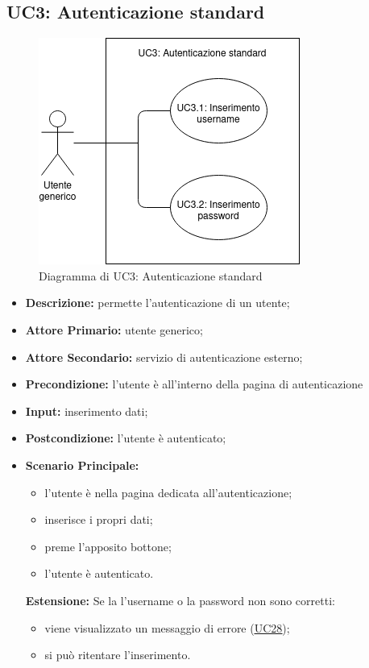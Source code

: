 \subsection{UC3: Autenticazione standard}
\begin{figure}[!ht]
    \caption{Diagramma di UC3: Autenticazione standard}
    \vspace{10px}
    \includegraphics[scale=0.5]{../../../Images/AnalisiRequisiti/UC03}
    \centering
\end{figure}
\label{sec:UC3}
\begin{itemize}
    \item \textbf{Descrizione:} permette l'autenticazione di un utente;
    \item \textbf{Attore Primario:} utente generico;
    \item \textbf{Attore Secondario:} servizio di autenticazione esterno;
    \item \textbf{Precondizione:} l'utente è all'interno della pagina di autenticazione
    \item \textbf{Input:} inserimento dati;
    \item \textbf{Postcondizione:} l'utente è autenticato;
    \item \textbf{Scenario Principale:} 
    \begin{itemize}
        \item l'utente è nella pagina dedicata all'autenticazione;
        \item inserisce i propri dati;
        \item preme l'apposito bottone;
        \item l'utente è autenticato.
    \end{itemize}
    \textbf{Estensione:}
        Se la l'username o la password non sono corretti:
        \begin{itemize}
            \item viene visualizzato un messaggio di errore (\hyperref[sec:UC28]{\underline{UC28}});
            \item si può ritentare l'inserimento.
        \end{itemize}
\end{itemize}
